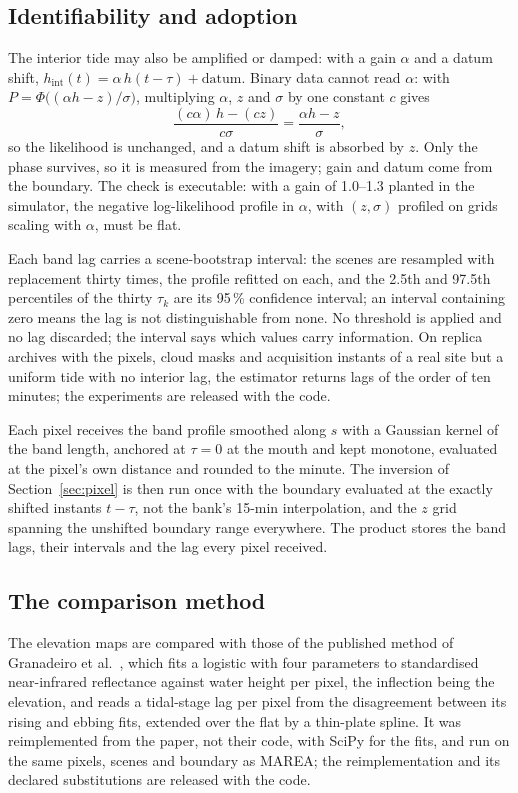 \subsection{Identifiability and adoption}\label{sec:adoption}

The interior tide may also be amplified or damped: with a gain $\alpha$
and a datum shift, $h_{\mathrm{int}}(t) = \alpha\,h(t-\tau) + \mathrm{datum}$.
Binary data cannot read $\alpha$: with $P = \Phi\big((\alpha h - z)/\sigma\big)$,
multiplying $\alpha$, $z$ and $\sigma$ by one constant $c$ gives
\begin{equation}\label{eq:affine}
\frac{(c\alpha)\,h - (cz)}{c\sigma} = \frac{\alpha h - z}{\sigma},
\end{equation}
so the likelihood is unchanged, and a datum shift is absorbed by $z$.
Only the phase survives, so it is measured from the imagery; gain and
datum come from the boundary. The check is executable: with a gain of
1.0--1.3 planted in the simulator, the negative log-likelihood profile
in $\alpha$, with $(z, \sigma)$ profiled on grids scaling with $\alpha$,
must be flat.

Each band lag carries a scene-bootstrap interval: the scenes are
resampled with replacement thirty times, the profile refitted on each,
and the 2.5th and 97.5th percentiles of the thirty $\tau_k$ are its
95\,\% confidence interval; an interval containing zero means the lag is
not distinguishable from none. No threshold is applied and no lag
discarded; the interval says which values carry information. On replica
archives with the pixels, cloud masks and acquisition instants of a real
site but a uniform tide with no interior lag, the estimator returns lags
of the order of ten minutes; the experiments are released with the code.

Each pixel receives the band profile smoothed along $s$ with a Gaussian
kernel of the band length, anchored at $\tau = 0$ at the mouth and kept
monotone, evaluated at the pixel's own distance and rounded to the
minute. The inversion of Section~\ref{sec:pixel} is then run once with
the boundary evaluated at the exactly shifted instants $t - \tau$, not
the bank's 15-min interpolation, and the $z$ grid spanning the unshifted
boundary range everywhere. The product stores the band lags, their
intervals and the lag every pixel received.

\subsection{The comparison method}\label{sec:granadeiro}

The elevation maps are compared with those of the published method of
Granadeiro et al.~\cite{granadeiro2021}, which fits a logistic with
four parameters to standardised near-infrared reflectance against water
height
per pixel, the inflection being the elevation, and reads a tidal-stage
lag per pixel from the disagreement between its rising and ebbing fits,
extended over the flat by a thin-plate spline. It was reimplemented from
the paper, not their code, with SciPy \cite{virtanen2020} for the fits,
and run on the same pixels, scenes and boundary as MAREA; the
reimplementation and its declared substitutions are released with the
code.
